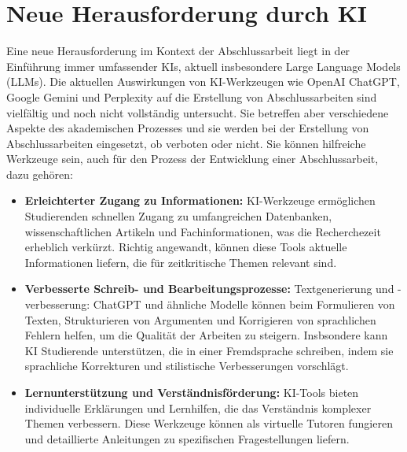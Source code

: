 \documentclass[conference]{IEEEtran}
\begin{document}
\section{Neue Herausforderung durch KI}

Eine neue Herausforderung im Kontext der Abschlussarbeit liegt in der Einführung immer umfassender KIs, aktuell insbesondere Large Language Models (LLMs). Die aktuellen Auswirkungen von KI-Werkzeugen wie OpenAI ChatGPT, Google Gemini und Perplexity auf die Erstellung von Abschlussarbeiten sind vielfältig und  noch nicht vollständig untersucht. Sie betreffen aber verschiedene Aspekte des akademischen Prozesses und sie werden bei der Erstellung von Abschlussarbeiten eingesetzt, ob verboten oder nicht. Sie können hilfreiche Werkzeuge sein, auch für den Prozess der Entwicklung einer Abschlussarbeit, dazu gehören:

\begin{itemize}[leftmargin=*]
    \item \textbf{Erleichterter Zugang zu Informationen:}
    \newline KI-Werkzeuge ermöglichen Studierenden schnellen Zugang zu umfangreichen Datenbanken, wissenschaftlichen Artikeln und Fachinformationen, was die Recherchezeit erheblich verkürzt.
    \newline Richtig angewandt, können diese Tools  aktuelle Informationen liefern, die für zeitkritische Themen relevant sind.

    \item \textbf{Verbesserte Schreib- und Bearbeitungsprozesse:}
    \newline Textgenerierung und -verbesserung: ChatGPT und ähnliche Modelle können beim Formulieren von Texten, Strukturieren von Argumenten und Korrigieren von sprachlichen Fehlern helfen, um  die Qualität der Arbeiten zu steigern.
    \newline Insbsondere kann  KI  Studierende unterstützen, die in einer Fremdsprache schreiben, indem sie sprachliche Korrekturen und stilistische Verbesserungen vorschlägt.

    \item \textbf{Lernunterstützung und Verständnisförderung:}
    \newline KI-Tools bieten individuelle Erklärungen und Lernhilfen, die das Verständnis komplexer Themen verbessern.
    \newline Diese Werkzeuge können als virtuelle Tutoren fungieren und detaillierte Anleitungen zu spezifischen Fragestellungen liefern.
\end{itemize}
\end{document}
